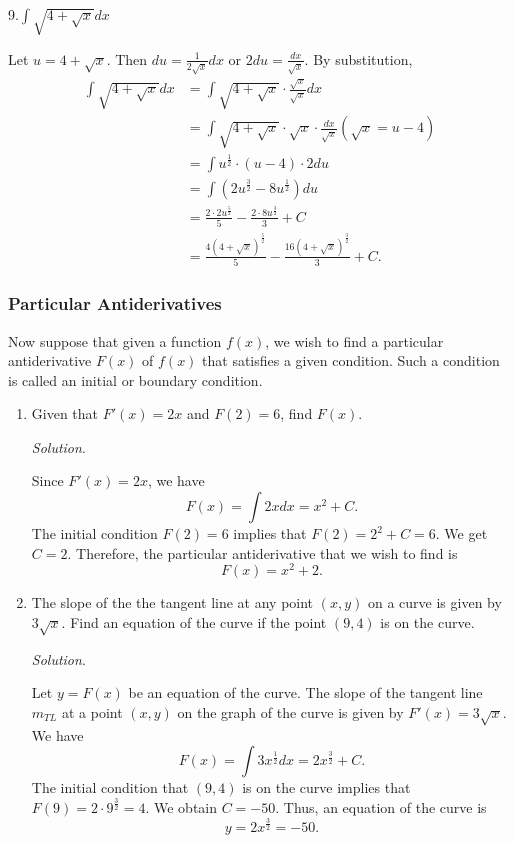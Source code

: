 \documentclass[
  letterpaper,
  DIV=11,
  numbers=noendperiod]{scrartcl}
\theoremstyle{plain}
\theoremstyle{remark}
\begin{document}
9.\(\int \sqrt{4+\sqrt x}dx\)

Let \(u=4+\sqrt x\). Then \(du=\frac{1}{2\sqrt x}dx\) or
\(2du=\frac{dx}{\sqrt x}\). By substitution, \[
\begin{aligned}
\int \sqrt{4+\sqrt x}dx&=\int \sqrt{4+\sqrt x} \cdot\frac{\sqrt x}{\sqrt x}dx\\&=\int \sqrt{4+\sqrt x} \cdot \sqrt x\cdot \frac{dx}{\sqrt x} (\sqrt x=u-4)\\&=\int u^\frac{1}{2}\cdot (u-4)\cdot 2du\\&=\int(2u^\frac{3}{2}-8u^\frac{1}{2}) du\\&=\frac{2\cdot2u^\frac{5}{2}}5-\frac{2\cdot 8u^\frac{3}{2}}{3}+C\\&=\frac{4\left (4+\sqrt x\right)^\frac{5}{2}}{5}-\frac{16\left(4+\sqrt x\right)^\frac{3}{2}}{3}+C.
\end{aligned}
\]

\hypertarget{htm:ParticularAntiderivatives}{}
\hypertarget{particular-antiderivatives}{%
\subsubsection{Particular
Antiderivatives}\label{particular-antiderivatives}}

Now suppose that given a function \(f(x)\), we wish to find a particular
antiderivative \(F(x)\) of \(f(x)\) that satisfies a given condition.
Such a condition is called an initial or boundary condition.

\hypertarget{exm:particular_derivatives}{}
\begin{enumerate}
\def\labelenumi{\arabic{enumi}.}
\item
  Given that \(F'(x)=2x\) and \(F(2)=6\), find \(F(x)\).

  \emph{Solution}.

  Since \(F'(x)=2x\), we have \[
  F(x)=\int 2xdx=x^2+C.
  \]The initial condition \(F(2)=6\) implies that \(F(2)=2^2+C=6\). We
  get \(C=2\). Therefore, the particular antiderivative that we wish to
  find is \[
  F(x)=x^2+2.
  \]
\item
  The slope of the the tangent line at any point \((x,y)\) on a curve is
  given by \(3\sqrt x\). Find an equation of the curve if the point
  \((9,4)\) is on the curve.

  \emph{Solution}.

  Let \(y=F(x)\) be an equation of the curve. The slope of the tangent
  line \(m_{TL}\) at a point \((x,y)\) on the graph of the curve is
  given by \(F'(x)=3\sqrt x\). We have \[
  F(x)=\int 3x^\frac{1}{2}dx=2x^\frac{3}{2}+C.
  \] The initial condition that \((9,4)\) is on the curve implies that
  \(F(9)=2\cdot 9^\frac{3}{2}=4\). We obtain \(C=-50\). Thus, an
  equation of the curve is \[
  y=2x^\frac{3}{2}=-50.
  \]
\end{enumerate}
\end{document}
